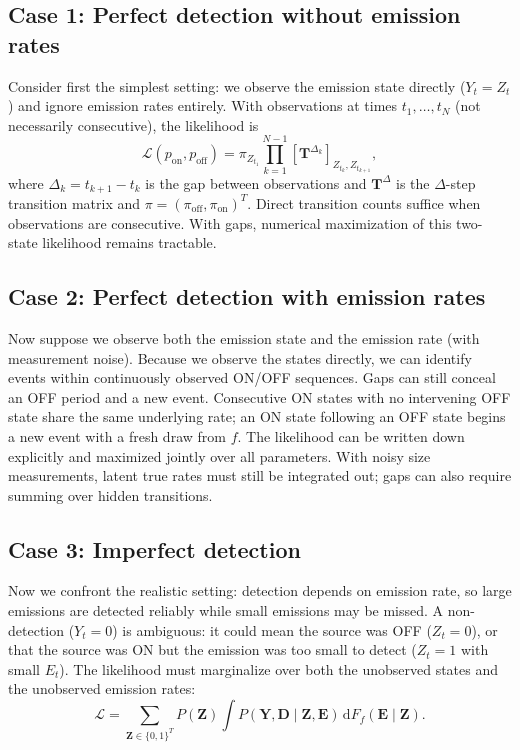 \documentclass[11pt]{article}
\begin{document}
\subsection{Case 1: Perfect detection without emission rates}

Consider first the simplest setting: we observe the emission state directly ($Y_t = Z_t$) and ignore emission rates entirely. With observations at times $t_1, \ldots, t_N$ (not necessarily consecutive), the likelihood is
\begin{equation}
    \mathcal{L}(p_{\text{on}}, p_{\text{off}}) = \pi_{Z_{t_1}} \prod_{k=1}^{N-1} [\mathbf{T}^{\Delta_k}]_{Z_{t_k}, Z_{t_{k+1}}},
\end{equation}
where $\Delta_k = t_{k+1} - t_k$ is the gap between observations and $\mathbf{T}^{\Delta}$ is the $\Delta$-step transition matrix and $\pi=(\pi_\text{off}, \pi_\text{on})^T$. Direct transition counts suffice when observations are consecutive. With gaps, numerical maximization of this two-state likelihood remains tractable.

\subsection{Case 2: Perfect detection with emission rates}

Now suppose we observe both the emission state and the emission rate (with measurement noise). Because we observe the states directly, we can identify events within continuously observed ON/OFF sequences. Gaps can still conceal an OFF period and a new event. Consecutive ON states with no intervening OFF state share the same underlying rate; an ON state following an OFF state begins a new event with a fresh draw from $f$. The likelihood can be written down explicitly and maximized jointly over all parameters. With noisy size measurements, latent true rates must still be integrated out; gaps can also require summing over hidden transitions.

\subsection{Case 3: Imperfect detection}

Now we confront the realistic setting: detection depends on emission rate, so large emissions are detected reliably while small emissions may be missed. A non-detection ($Y_t = 0$) is ambiguous: it could mean the source was OFF ($Z_t = 0$), or that the source was ON but the emission was too small to detect ($Z_t = 1$ with small $E_t$). The likelihood must marginalize over both the unobserved states and the unobserved emission rates:
\begin{equation}
    \mathcal L=\sum_{\mathbf Z\in\{0,1\}^T}P(\mathbf Z)
    \int P(\mathbf Y,\mathbf D\mid\mathbf Z,\mathbf E)
    \,\mathrm dF_f(\mathbf E\mid\mathbf Z).
    \label{eq:full_likelihood_SI}
\end{equation}
\end{document}
